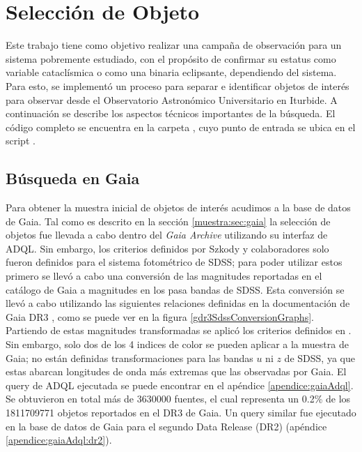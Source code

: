 \chapter{Selección de Objeto} \label{muestra:crit_seleccion}

Este trabajo tiene como objetivo realizar una campaña de observación para un
sistema pobremente estudiado, con el propósito de confirmar su estatus como
variable cataclísmica o como una binaria eclipsante, dependiendo del sistema.
Para esto, se implementó un proceso para separar e identificar objetos de
interés para observar desde el Observatorio Astronómico Universitario en
Iturbide. A continuación se describe los aspectos técnicos importantes de la
búsqueda. El código completo se encuentra en la carpeta
\href{https://github.com/KnightIV/UANL_MAPTA_Observaciones/tree/main/obsrv_plan}{},
cuyo punto de entrada se ubica en el script
\href{URLhttps://github.com/KnightIV/UANL_MAPTA_Observaciones/blob/main/obsrv_plan/main.py}{}.

\section{Búsqueda en Gaia}  \label{muestra:crit_seleccion:busqueda_fotometrica}

Para obtener la muestra inicial de objetos de interés acudimos a la base de
datos de Gaia. Tal como es descrito en la sección \ref{muestra:sec:gaia} la
selección de objetos fue llevada a cabo dentro del \textit{Gaia Archive}
utilizando su interfaz de ADQL. Sin embargo, los criterios definidos por Szkody
y colaboradores solo fueron definidos para el sistema fotométrico de SDSS; para
poder utilizar estos primero se llevó a cabo una conversión de las magnitudes
reportadas en el catálogo de Gaia a magnitudes en los pasa bandas de SDSS. Esta
conversión se llevó a cabo utilizando las siguientes relaciones definidas en la
documentación de Gaia DR3 , como se puede
ver en la figura \ref{gdr3SdssConversionGraphs}. Partiendo de estas magnitudes
transformadas se aplicó los criterios definidos en
. Sin embargo, solo dos de los 4 indices de color
se pueden aplicar a la muestra de Gaia; no están definidas transformaciones para
las bandas $u$ ni $z$ de SDSS, ya que estas abarcan longitudes de onda más
extremas que las observadas por Gaia. El query de ADQL ejecutada se puede
encontrar en el apéndice \ref{apendice:gaiaAdql}. Se obtuvieron en total más de
\num{3630000} fuentes, el cual representa un 0.2\% de los \num{1811709771} objetos
reportados en el DR3 de Gaia. Un query similar fue ejecutado en la base de datos
de Gaia para el segundo Data Release (DR2) (apéndice \ref{apendice:gaiaAdql:dr2}). 

